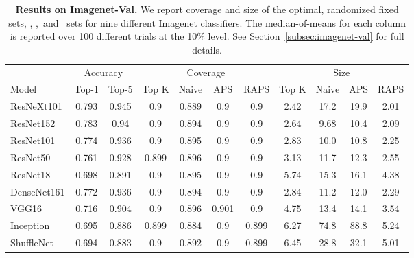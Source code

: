 \begin{table}[t] 
\centering 
\small 
\begin{tabular}{lcccccccccc} 
\toprule 
 & \multicolumn{2}{c}{Accuracy}  & \multicolumn{4}{c}{Coverage} & \multicolumn{4}{c}{Size} \\ 
\cmidrule(r){2-3}  \cmidrule(r){4-7}  \cmidrule(r){8-11} 
Model & Top-1 & Top-5 & Top K & Naive & APS & RAPS & Top K & Naive & APS & RAPS \\ 
\midrule 
 ResNeXt101 &  0.793 &  0.945 & 0.9 & 0.889 & 0.9 & 0.9 & 2.42 & 17.2 & 19.9 & 2.01 \\ 
 ResNet152 &  0.783 &  0.94 & 0.9 & 0.894 & 0.9 & 0.9 & 2.64 & 9.68 & 10.4 & 2.09 \\ 
 ResNet101 &  0.774 &  0.936 & 0.9 & 0.895 & 0.9 & 0.9 & 2.83 & 10.0 & 10.8 & 2.25 \\ 
 ResNet50 &  0.761 &  0.928 & 0.899 & 0.896 & 0.9 & 0.9 & 3.13 & 11.7 & 12.3 & 2.55 \\ 
 ResNet18 &  0.698 &  0.891 & 0.9 & 0.895 & 0.9 & 0.9 & 5.74 & 15.3 & 16.1 & 4.38 \\ 
 DenseNet161 &  0.772 &  0.936 & 0.9 & 0.894 & 0.9 & 0.9 & 2.84 & 11.2 & 12.0 & 2.29 \\ 
 VGG16 &  0.716 &  0.904 & 0.9 & 0.896 & 0.901 & 0.9 & 4.75 & 13.4 & 14.1 & 3.54 \\ 
 Inception &  0.695 &  0.886 & 0.899 & 0.884 & 0.9 & 0.899 & 6.27 & 74.8 & 88.8 & 5.24 \\ 
 ShuffleNet &  0.694 &  0.883 & 0.9 & 0.892 & 0.9 & 0.899 & 6.45 & 28.8 & 32.1 & 5.01 \\ 
\bottomrule 
\end{tabular} 
\caption{\textbf{Results on Imagenet-Val.} We report coverage and size of the optimal, randomized fixed sets, \naive, \aps,\ and \raps\ sets for nine different Imagenet classifiers. The median-of-means for each column is reported over 100 different trials at the 10\% level. See Section~\ref{subsec:imagenet-val} for full details.} 
\label{table:imagenet-val} 
\end{table} 

